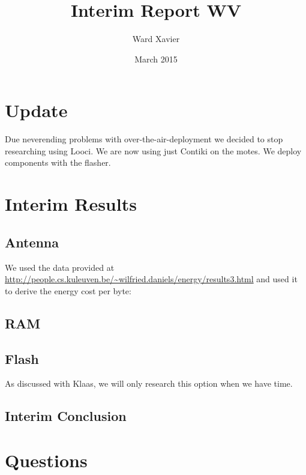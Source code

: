 \documentclass{article}
\title{Interim Report WV}
\author{Ward  Xavier}
\date{March 2015}
\begin{document}
\maketitle

\section{Update}
Due neverending problems with over-the-air-deployment we decided to stop researching using Looci. We are now using just Contiki on the motes. We deploy components with the flasher.
\section{Interim Results}
\subsection{Antenna}
We used the data provided at \url{http://people.cs.kuleuven.be/~wilfried.daniels/energy/results3.html} and used it to derive the energy cost per byte:

\subsection{RAM}

\subsection{Flash}
As discussed with Klaas, we will only research this option when we have time.

\subsection{Interim Conclusion}
\section{Questions}
\end{document}
